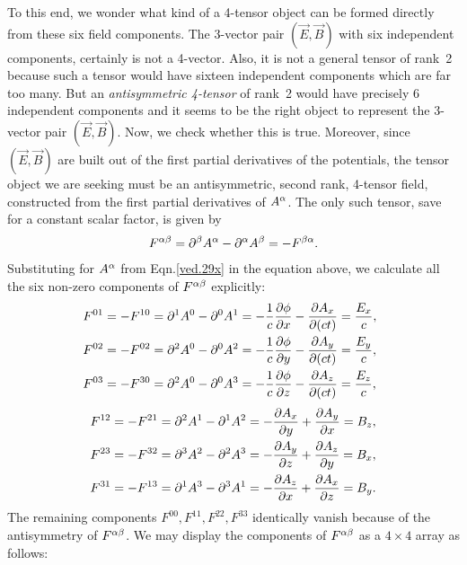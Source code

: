 To this end, we wonder what kind of a 4-tensor object can 
be formed directly from these six field components. 
The 3-vector pair $(\vec{E},\vec{B})$ with six independent  
components, certainly is not a 4-vector. Also, it  is not a 
general tensor of rank~2 because  such a tensor would have 
sixteen independent components which are far too many. But 
an \textsl{antisymmetric 4-tensor} of rank~2 would have 
precisely 6 independent components and it seems to be the 
right object to represent the 3-vector pair 
$(\vec{E},\vec{B})$. Now, we  check whether this is true. 
Moreover, since $(\vec{E},\vec{B})$ are built out of the 
first 
partial derivatives of the potentials, the tensor object we 
are seeking must be an antisymmetric, second rank, 4-tensor 
field, constructed from the first partial derivatives of 
$A^{{\alpha}}$. The only such tensor, save for a constant scalar 
factor, is given by
\begin{align}\label{ved.24}
F^{{\alpha}{\beta}}={\partial}^{{\beta}}  A^{{\alpha}} - {\partial}^{{\alpha}} A^{{\beta}}
=-F^{{\beta}{\alpha}}.
\end{align}
Substituting  for  $A^{{\alpha}}$ from Eqn.\eqref{ved.29x} in the 
equation above, we calculate all the six non-zero 
components 
of $F^{{\alpha}{\beta}}$  explicitly:
\begin{align*}
&\nnnt F^{01}=-F^{10}=\dow^1 A^0-\dow^0 A^1
=-\frac{1}{c}\frac{\dow \phi}{\dow x} -
\frac{\dow A_x}{\dow (ct)}=\frac{E_x}{c},\\
&\nnnt F^{02}=-F^{02}=\dow^2 A^0-\dow^0 A^2
=-\frac{1}{c}\frac{\dow \phi}{\dow y}
-\frac{\dow A_y}{\dow (ct)} =\frac{E_y}{c},\\
&\nnnt F^{03}=-F^{30}=\dow^2 A^0-\dow^0 A^3
=-\frac{1}{c}\frac{\dow \phi}{\dow z}
-\frac{\dow A_z}{\dow (ct)} =\frac{E_z}{c},
\end{align*}
\begin{align*}
&F^{12}=-F^{21}={\partial}^2 A^1-{\partial}^1 A^2
=-\frac{{\partial} A_x}{{\partial} y}
+\frac{{\partial} A_y}{{\partial} x}=B_z,\\
&F^{23}=-F^{32}={\partial}^3 A^2-{\partial}^2 A^3
=-\frac{{\partial} A_y}{{\partial} z}
+\frac{{\partial} A_z}{{\partial} y}=B_x,\\
&F^{31}=-F^{13}={\partial}^1 A^3-{\partial}^3 A^1
=-\frac{{\partial} A_z}{{\partial} x}
+\frac{{\partial} A_x}{{\partial} z}=B_y.
\end{align*}
The remaining components $F^{00},F^{11}, F^{22},F^{33}$ 
identically vanish because of the antisymmetry of 
$F^{{\alpha}{\beta}}$. We may  display the components of 
$F^{{\alpha}{\beta}}$ as a $4 \times 4$ array as follows:
